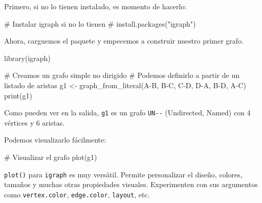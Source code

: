 \documentclass[
  spanish,
  letterpaper,
  DIV=11,
  numbers=noendperiod]{scrreprt}
\newenvironment{Shaded}{\begin{snugshade}}{\end{snugshade}}
\newcommand{\CommentTok}[1]{\textcolor[rgb]{0.37,0.37,0.37}{#1}}
\newcommand{\FunctionTok}[1]{\textcolor[rgb]{0.28,0.35,0.67}{#1}}
\newcommand{\NormalTok}[1]{\textcolor[rgb]{0.00,0.23,0.31}{#1}}
\newcommand{\OtherTok}[1]{\textcolor[rgb]{0.00,0.23,0.31}{#1}}
\newcommand{\SpecialCharTok}[1]{\textcolor[rgb]{0.37,0.37,0.37}{#1}}
\begin{document}
Primero, si no lo tienen instalado, es momento de hacerlo:

\begin{Shaded}
\begin{Highlighting}[]
\CommentTok{\# Instalar igraph si no lo tienen}
\CommentTok{\# install.packages("igraph")}
\end{Highlighting}
\end{Shaded}

Ahora, carguemos el paquete y empecemos a construir nuestro primer
grafo.

\begin{Shaded}
\begin{Highlighting}[]
\FunctionTok{library}\NormalTok{(igraph)}

\CommentTok{\# Creamos un grafo simple no dirigido}
\CommentTok{\# Podemos definirlo a partir de un listado de aristas}
\NormalTok{g1 }\OtherTok{\textless{}{-}} \FunctionTok{graph\_from\_literal}\NormalTok{(A}\SpecialCharTok{{-}}\NormalTok{B, B}\SpecialCharTok{{-}}\NormalTok{C, C}\SpecialCharTok{{-}}\NormalTok{D, D}\SpecialCharTok{{-}}\NormalTok{A, B}\SpecialCharTok{{-}}\NormalTok{D, A}\SpecialCharTok{{-}}\NormalTok{C)}
\FunctionTok{print}\NormalTok{(g1)}
\end{Highlighting}
\end{Shaded}

Como pueden ver en la salida, \texttt{g1} es un grafo \texttt{UN-\/-}
(Undirected, Named) con 4 vértices y 6 aristas.

Podemos visualizarlo fácilmente:

\begin{Shaded}
\begin{Highlighting}[]
\CommentTok{\# Visualizar el grafo}
\FunctionTok{plot}\NormalTok{(g1)}
\end{Highlighting}
\end{Shaded}

\begin{tcolorbox}[enhanced jigsaw, arc=.35mm, bottomrule=.15mm, bottomtitle=1mm, breakable, colback=white, colbacktitle=quarto-callout-note-color!10!white, colframe=quarto-callout-note-color-frame, coltitle=black, left=2mm, leftrule=.75mm, opacityback=0, opacitybacktitle=0.6, rightrule=.15mm, title=\textcolor{quarto-callout-note-color}{\faInfo}\hspace{0.5em}{Nota}, titlerule=0mm, toprule=.15mm, toptitle=1mm]

\texttt{plot()} para \texttt{igraph} es muy versátil. Permite
personalizar el diseño, colores, tamaños y muchas otras propiedades
visuales. Experimenten con sus argumentos como \texttt{vertex.color},
\texttt{edge.color}, \texttt{layout}, etc.

\end{tcolorbox}
\end{document}
